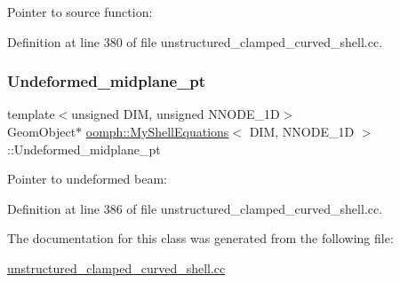 Pointer to source function\+: 



Definition at line 380 of file unstructured\+\_\+clamped\+\_\+curved\+\_\+shell.\+cc.

\mbox{\label{classoomph_1_1MyShellEquations_acf0107874213e70145eae84dfb3d4b5a}} 
\subsubsection{\texorpdfstring{Undeformed\+\_\+midplane\+\_\+pt}{Undeformed\_midplane\_pt}}
{\footnotesize\ttfamily template$<$unsigned D\+IM, unsigned N\+N\+O\+D\+E\+\_\+1D$>$ \\
Geom\+Object$\ast$ \hyperlink{classoomph_1_1MyShellEquations}{oomph\+::\+My\+Shell\+Equations}$<$ D\+IM, N\+N\+O\+D\+E\+\_\+1D $>$\+::Undeformed\+\_\+midplane\+\_\+pt\hspace{0.3cm}{\ttfamily [protected]}}



Pointer to undeformed beam\+: 



Definition at line 386 of file unstructured\+\_\+clamped\+\_\+curved\+\_\+shell.\+cc.



The documentation for this class was generated from the following file\+:\begin{DoxyCompactItemize}
\item 
\hyperlink{unstructured__clamped__curved__shell_8cc}{unstructured\+\_\+clamped\+\_\+curved\+\_\+shell.\+cc}\end{DoxyCompactItemize}
